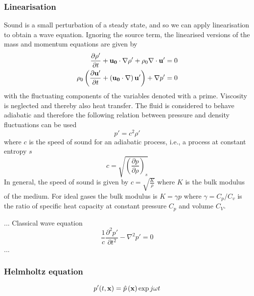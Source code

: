 \subsubsection*{Linearisation}
Sound is a small perturbation of a steady state, and so we can apply linearisation to obtain a wave equation.
Ignoring the source term, the linearised versions of the mass and momentum equations are given by
\begin{align}
 \frac{\partial \rho'}{\partial t} + \mathbf{u_0} \cdot \nabla \rho' + \rho_0 \nabla \cdot \mathbf{u'} = 0 \\
 \rho_0 \left( \frac{\partial \mathbf{u'}}{\partial t} + \left(\mathbf{u_0} \cdot \nabla \right) \mathbf{u'}\right) + \nabla p' = 0
\end{align}
with the fluctuating components of the variables denoted with a prime. Viscosity
is neglected and thereby also heat transfer. The fluid is considered to behave
adiabatic and therefore the following relation between pressure and density
fluctuations can be used
\begin{equation}
  p' = c^2 \rho'
\end{equation}
where $c$ is the speed of sound for an adiabatic process, i.e., a process at constant entropy $s$
\begin{equation}
  c = \sqrt{ \left( \frac{\partial p}{\partial \rho} \right)_{s} }
\end{equation}
In general, the speed of sound is given by $c = \sqrt{\frac{K}{\rho}}$ where $K$
is the bulk modulus of the medium. For ideal gases the bulk modulus is $K=\gamma
p$ where $\gamma=C_p/C_v$ is the ratio of specific heat capacity at constant
pressure $C_p$ and volume $C_V$.

...
Classical wave equation
\begin{equation}\label{eq:theory:sound:wave:classic}
 \frac{1}{c} \frac{\partial^2 p'}{\partial t^2} - \nabla^2 p' = 0
\end{equation}
...


\subsubsection*{Helmholtz equation}

\begin{equation}
  p' (t, \mathbf{x}) = \hat{p} \left(\mathbf{x}\right) \exp{j \omega t}
\end{equation}


